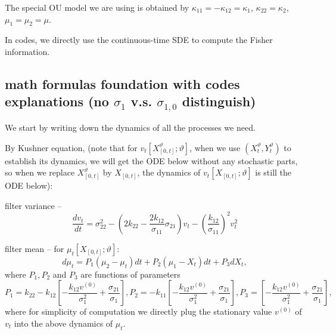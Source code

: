 \documentclass[11pt]{article}%
\theoremstyle{definition}
\begin{document}
The special OU model we are using is obtained by $\kappa_{11}=-\kappa
_{12}=\kappa_{1}$, $\kappa_{22}=\kappa_{2}$, $\mu_{1}=\mu_{2}=\mu$.

In codes, we directly use the continuous-time SDE to compute the Fisher information.

\subsection{math formulas foundation with codes explanations (no $\sigma_{1}$
v.s. $\sigma_{1,0}$ distinguish)}

We start by writing down the dynamics of all the processes we need.

By Kushner equation, (note that for $v_{t}[X_{[0,t]}^{\vartheta};\vartheta]$,
when we use $(X_{t}^{\vartheta},Y_{t}^{\vartheta})$ to establish its dynamics,
we will get the ODE below without any stochastic parts, so when we replace
$X_{[0,t]}^{\vartheta}$ by $X_{[0,t]}$, the dynamics of $v_{t}[X_{[0,t]}%
;\vartheta]$ is still the ODE below):

filter variance --%
\[
\frac{dv_{t}}{dt}=\sigma_{22}^{2}-\left(  2k_{22}-\frac{2k_{12}}{\sigma_{11}%
}\sigma_{21}\right)  v_{t}-\left(  \frac{k_{12}}{\sigma_{11}}\right)
^{2}v_{t}^{2}%
\]


filter mean -- for $\mu_{t}[X_{[0,t]};\vartheta]$:%
\begin{equation}
d\mu_{t}=P_{1}\left(  \mu_{2}-\mu_{t}\right)  dt+P_{2}\left(  \mu_{1}%
-X_{t}\right)  dt+P_{3}dX_{t},\label{2DOU filter mean SDE}%
\end{equation}
where $P_{1},P_{2}$ and $P_{3}$ are functions of parameters%
\[
P_{1}=k_{22}-k_{12}\left[  -\frac{k_{12}v^{\left(  0\right)  }}{\sigma_{1}%
^{2}}+\frac{\sigma_{21}}{\sigma_{1}}\right]  ,P_{2}=-k_{11}\left[
-\frac{k_{12}v^{\left(  0\right)  }}{\sigma_{1}^{2}}+\frac{\sigma_{21}}%
{\sigma_{1}}\right]  ,P_{3}=\left[  -\frac{k_{12}v^{\left(  0\right)  }%
}{\sigma_{1}^{2}}+\frac{\sigma_{21}}{\sigma_{1}}\right]  ,
\]
where for simplicity of computation we directly plug the stationary value
$v^{\left(  0\right)  }$ of $v_{t}$ into the above dynamics of $\mu_{t}$.
\end{document}
